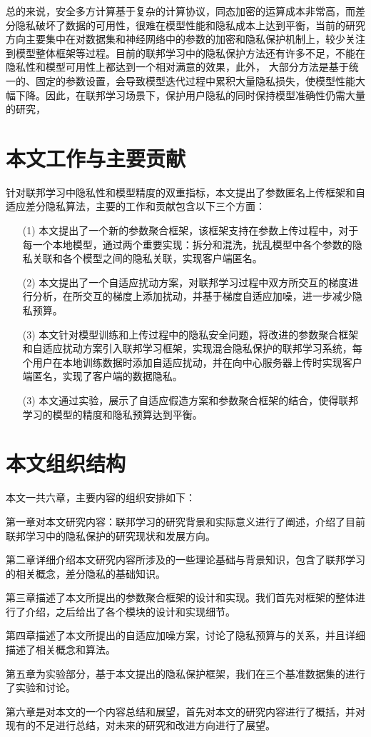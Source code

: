 总的来说，安全多方计算基于复杂的计算协议，同态加密的运算成本非常高，而差分隐私破坏了数据的可用性，很难在模型性能和隐私成本上达到平衡，当前的研究方向主要集中在对数据集和神经网络中的参数的加密和隐私保护机制上，较少关注到模型整体框架等过程。目前的联邦学习中的隐私保护方法还有许多不足，不能在隐私性和模型可用性上都达到一个相对满意的效果，此外， 大部分方法是基于统一的、固定的参数设置，会导致模型迭代过程中累积大量隐私损失，使模型性能大幅下降。因此，在联邦学习场景下，保护用户隐私的同时保持模型准确性仍需大量的研究，


\section{本文工作与主要贡献}
针对联邦学习中隐私性和模型精度的双重指标，本文提出了参数匿名上传框架和自适应差分隐私算法，主要的工作和贡献包含以下三个方面：
\begin{enumerate}
\item [(1)] 本文提出了一个新的参数聚合框架，该框架支持在参数上传过程中，对于每一个本地模型，通过两个重要实现：拆分和混洗，扰乱模型中各个参数的隐私关联和各个模型之间的隐私关联，实现客户端匿名。
\item [(2)] 本文提出了一个自适应扰动方案，对联邦学习过程中双方所交互的梯度进行分析，在所交互的梯度上添加扰动，并基于梯度自适应加噪，进一步减少隐私预算。
\item [(3)] 本文针对模型训练和上传过程中的隐私安全问题，将改进的参数聚合框架和自适应扰动方案引入联邦学习框架，实现混合隐私保护的联邦学习系统，每个用户在本地训练数据时添加自适应扰动，并在向中心服务器上传时实现客户端匿名，实现了客户端的数据隐私。
\item [(3)] 本文通过实验，展示了自适应假造方案和参数聚合框架的结合，使得联邦学习的模型的精度和隐私预算达到平衡。
\end{enumerate}

\section{本文组织结构}

本文一共六章，主要内容的组织安排如下：

第一章对本文研究内容：联邦学习的研究背景和实际意义进行了阐述，介绍了目前联邦学习中的隐私保护的研究现状和发展方向。

第二章详细介绍本文研究内容所涉及的一些理论基础与背景知识，包含了联邦学习的相关概念，差分隐私的基础知识。

第三章描述了本文所提出的参数聚合框架的设计和实现。我们首先对框架的整体进行了介绍，之后给出了各个模块的设计和实现细节。
  
第四章描述了本文所提出的自适应加噪方案，讨论了隐私预算与的关系，并且详细描述了相关概念和算法。
    
第五章为实验部分，基于本文提出的隐私保护框架，我们在三个基准数据集的进行了实验和讨论。

第六章是对本文的一个内容总结和展望，首先对本文的研究内容进行了概括，并对现有的不足进行总结，对未来的研究和改进方向进行了展望。



